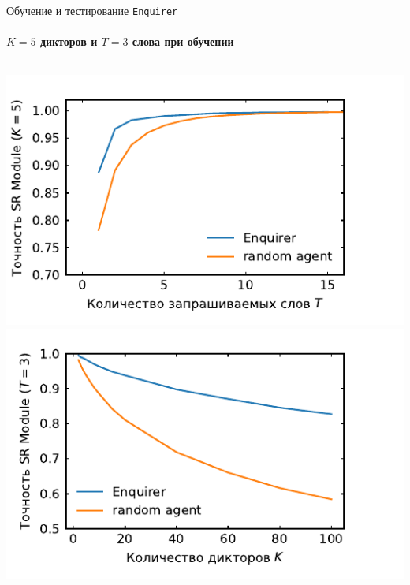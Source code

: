 \documentclass[aspectratio=169]{beamer}
\newcommand{\enquirer}{\texttt{Enquirer}}
\begin{document}
\begin{frame}{Обучение и тестирование \enquirer{}}
    \framesubtitle{$K = 5$ дикторов  и $T = 3$ слова при обучении}
    \begin{columns}
        \centering
        \includegraphics[width=.95\textwidth]{../plots/word_sweep_enq.pdf}
        \includegraphics[width=.95\textwidth]{../plots/guest_sweep_enq.pdf}
    \end{columns}\vspace*{1em}


\end{frame}
\end{document}
